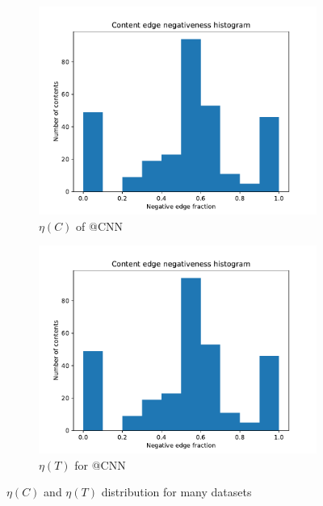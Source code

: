 \begin{figure}
\begin{center}
		\begin{subfigure}[b]{0.4\textwidth}
			\centering
			\includegraphics[width=\textwidth]{tex/out/foxnews2000/neg-fraction-content-hist.pdf}
			\caption{$\eta(C)$ of @CNN}
			\label{fig:CNN-content-eta}
		\end{subfigure}
		\begin{subfigure}[b]{0.4\textwidth}
			\centering
			\includegraphics[width=\textwidth]{tex/out/foxnews2000/neg-fraction-content-hist.pdf}
			\caption{$\eta(T)$ for @CNN}
			\label{fig:CNN-thread-eta}
		\end{subfigure}
		\caption{$\eta(C)$ and $\eta(T)$ distribution for many datasets}
		\label{fig:eta-content-thread}
	\end{center}
\end{figure}

